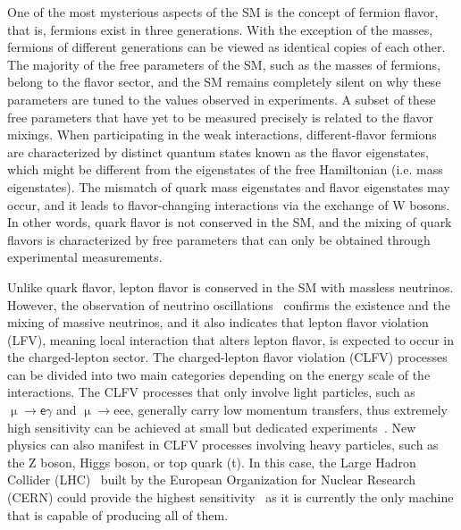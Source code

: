 One of the most mysterious aspects of the \ac{SM} is the concept of fermion flavor, that is, fermions exist in three generations. With the exception of the masses, fermions of different generations can be viewed as identical copies of each other. The majority of the free parameters of the \ac{SM}, such as the masses of fermions, belong to the flavor sector, and the \ac{SM} remains completely silent on why these parameters are tuned to the values observed in experiments. A subset of these free parameters that have yet to be measured precisely is related to the flavor mixings. When participating in the weak interactions, different-flavor fermions are characterized by distinct quantum states known as the flavor eigenstates, which might be different from the eigenstates of the free Hamiltonian (i.e. mass eigenstates). The mismatch of quark mass eigenstates and flavor eigenstates may occur, and it leads to flavor-changing interactions via the exchange of W bosons. In other words, quark flavor is not conserved in the \ac{SM}, and the mixing of quark flavors is characterized by free parameters that can only be obtained through experimental measurements. 

Unlike quark flavor, lepton flavor is conserved in the \ac{SM} with massless neutrinos. However, the observation of neutrino oscillations~\cite{Super-Kamiokande:1998kpq,SNO:2002tuh} confirms the existence and the mixing of massive neutrinos, and it also indicates that lepton flavor violation (LFV), meaning local interaction that alters lepton flavor, is expected to occur in the charged-lepton sector. The charged-lepton flavor violation (\ac{CLFV}) processes can be divided into two main categories depending on the energy scale of the interactions. The \ac{CLFV} processes that only involve light particles, such as $\upmu\rightarrow\textsf{e}\gamma$ and $\upmu\rightarrow$eee, generally carry low momentum transfers, thus extremely high sensitivity can be achieved at small but dedicated experiments~\cite{MEGII:2018kmf,Mu3e:2020gyw}. New physics can also manifest in \ac{CLFV} processes involving heavy particles, such as the Z boson, Higgs boson, or top quark (t). In this case, the Large Hadron Collider (\ac{LHC})~\cite{Evans:2008zzb} built by the European Organization for Nuclear Research (\ac{CERN}) could provide the highest sensitivity~\cite{Davidson:2012wn} as it is currently the only machine that is capable of producing all of them.

